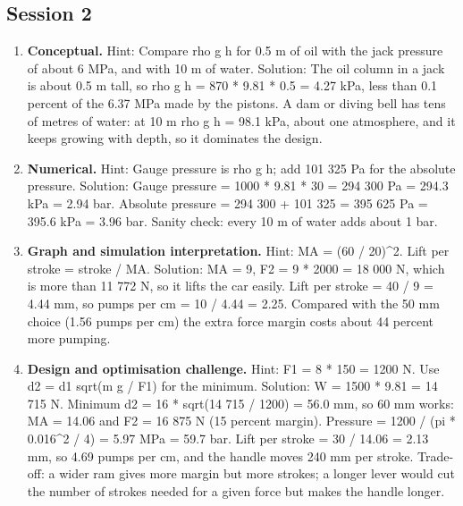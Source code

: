 \documentclass[11pt,a4paper]{article}
\begin{document}
\subsection*{Session 2}
\begin{enumerate}[nosep]
\item \textbf{Conceptual.} Hint: Compare rho g h for 0.5 m of oil with the jack pressure of about 6 MPa, and with 10 m of water. Solution: The oil column in a jack is about 0.5 m tall, so rho g h = 870 * 9.81 * 0.5 = 4.27 kPa, less than 0.1 percent of the 6.37 MPa made by the pistons. A dam or diving bell has tens of metres of water: at 10 m rho g h = 98.1 kPa, about one atmosphere, and it keeps growing with depth, so it dominates the design.
\item \textbf{Numerical.} Hint: Gauge pressure is rho g h; add 101 325 Pa for the absolute pressure. Solution: Gauge pressure = 1000 * 9.81 * 30 = 294 300 Pa = 294.3 kPa = 2.94 bar. Absolute pressure = 294 300 + 101 325 = 395 625 Pa = 395.6 kPa = 3.96 bar. Sanity check: every 10 m of water adds about 1 bar.
\item \textbf{Graph and simulation interpretation.} Hint: MA = (60 / 20)\textasciicircum{}2. Lift per stroke = stroke / MA. Solution: MA = 9, F2 = 9 * 2000 = 18 000 N, which is more than 11 772 N, so it lifts the car easily. Lift per stroke = 40 / 9 = 4.44 mm, so pumps per cm = 10 / 4.44 = 2.25. Compared with the 50 mm choice (1.56 pumps per cm) the extra force margin costs about 44 percent more pumping.
\item \textbf{Design and optimisation challenge.} Hint: F1 = 8 * 150 = 1200 N. Use d2 = d1 sqrt(m g / F1) for the minimum. Solution: W = 1500 * 9.81 = 14 715 N. Minimum d2 = 16 * sqrt(14 715 / 1200) = 56.0 mm, so 60 mm works: MA = 14.06 and F2 = 16 875 N (15 percent margin). Pressure = 1200 / (pi * 0.016\textasciicircum{}2 / 4) = 5.97 MPa = 59.7 bar. Lift per stroke = 30 / 14.06 = 2.13 mm, so 4.69 pumps per cm, and the handle moves 240 mm per stroke. Trade-off: a wider ram gives more margin but more strokes; a longer lever would cut the number of strokes needed for a given force but makes the handle longer.
\end{enumerate}
\end{document}
